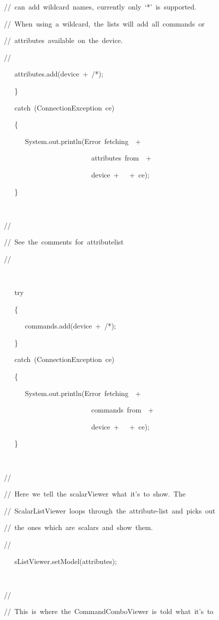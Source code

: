 \begin{lyxcode}
//~can~add~wildcard~names,~currently~only~`{*}'~is~supported.

//~When~using~a~wildcard,~the~lists~will~add~all~commands~or

//~attributes~available~on~the~device.

//

~~~attributes.add(device~+~\textquotedbl{}/{*}\textquotedbl{});

~~~\}

~~~catch~(ConnectionException~ce)

~~~\{

~~~~~~System.out.println(\textquotedbl{}Error~fetching~\textquotedbl{}~+~

~~~~~~~~~~~~~~~~~~~~~~~~~\textquotedbl{}attributes~from~\textquotedbl{}~+

~~~~~~~~~~~~~~~~~~~~~~~~~device~+~\textquotedbl{}~\textquotedbl{}~+~ce);

~~~\}

~

//

//~See~the~comments~for~attributelist

//

~

~~~try

~~~\{

~~~~~~commands.add(device~+~\textquotedbl{}/{*}\textquotedbl{});

~~~\}

~~~catch~(ConnectionException~ce)

~~~\{

~~~~~~System.out.println(\textquotedbl{}Error~fetching~\textquotedbl{}~+

~~~~~~~~~~~~~~~~~~~~~~~~~\textquotedbl{}commands~from~\textquotedbl{}~+

~~~~~~~~~~~~~~~~~~~~~~~~~device~+~\textquotedbl{}~\textquotedbl{}~+~ce);

~~~\}

~

//

//~Here~we~tell~the~scalarViewer~what~it's~to~show.~The

//~ScalarListViewer~loops~through~the~attribute-list~and~picks~out

//~the~ones~which~are~scalars~and~show~them.

//

~~~sListViewer.setModel(attributes);

~

//

//~This~is~where~the~CommandComboViewer~is~told~what~it's~to


\end{lyxcode}
